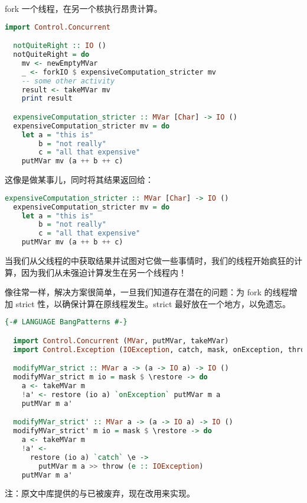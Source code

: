 \documentclass[./main.tex]{subfiles}
\begin{document}
fork 一个线程，在另一个核执行昂贵计算。

\begin{lstlisting}[language=Haskell]
  import Control.Concurrent

  notQuiteRight :: IO ()
  notQuiteRight = do
    mv <- newEmptyMVar
    _ <- forkIO $ expensiveComputation_stricter mv
    -- some other activity
    result <- takeMVar mv
    print result

  expensiveComputation_stricter :: MVar [Char] -> IO ()
  expensiveComputation_stricter mv = do
    let a = "this is"
        b = "not really"
        c = "all that expensive"
    putMVar mv (a ++ b ++ c)
\end{lstlisting}

这像是做某事儿，同时将其结果返回给：

\begin{lstlisting}[language=Haskell]
  expensiveComputation_stricter :: MVar [Char] -> IO ()
  expensiveComputation_stricter mv = do
    let a = "this is"
        b = "not really"
        c = "all that expensive"
    putMVar mv (a ++ b ++ c)
\end{lstlisting}

当我们从父线程的中获取结果并试图对它做一些事情时，我们的线程开始疯狂的计算，因为我们从未强迫计算发生在另一个线程内！

像往常一样，解决方案很简单，一旦我们知道存在潜在的问题：为 fork 的线程增加 strict 性，以确保计算在原线程发生。strict 最好放在一个地方，以免遗忘。

\begin{lstlisting}[language=Haskell]
  {-# LANGUAGE BangPatterns #-}

  import Control.Concurrent (MVar, putMVar, takeMVar)
  import Control.Exception (IOException, catch, mask, onException, throw)

  modifyMVar_strict :: MVar a -> (a -> IO a) -> IO ()
  modifyMVar_strict m io = mask $ \restore -> do
    a <- takeMVar m
    !a' <- restore (io a) `onException` putMVar m a
    putMVar m a'

  modifyMVar_strict' :: MVar a -> (a -> IO a) -> IO ()
  modifyMVar_strict' m io = mask $ \restore -> do
    a <- takeMVar m
    !a' <-
      restore (io a) `catch` \e ->
        putMVar m a >> throw (e :: IOException)
    putMVar m a'
\end{lstlisting}

注：原文中库提供的与已被废弃，现在改用来实现。
\end{document}
